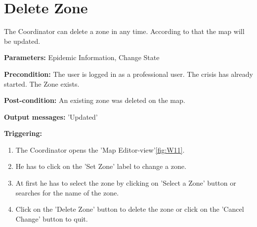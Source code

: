 \section{Delete Zone}
\label{operation:DeleteZone}
The Coordinator can delete a zone in any time. According
to that the map will be updated.\\
\begin{description}
\item \textbf{Parameters:} Epidemic Information, Change State
\item \textbf{Precondition:} The user is logged in as a professional user. The
crisis has already started. The Zone exists.
\item \textbf{Post-condition:} An existing zone was deleted on the map.
\item \textbf{Output messages:} 'Updated'
\item \textbf{Triggering:}
\begin{enumerate}
\item The Coordinator opens the 'Map Editor-view'\ref{fig:W11}.
\item He has to click on the 'Set Zone' label to change a zone.
\item At first he has to select the zone by clicking on 'Select a Zone' button
or searches for the name of the zone.
\item Click on the 'Delete Zone' button to delete the zone or click on the
'Cancel Change' button to quit.
\end{enumerate}
\end{description}   


